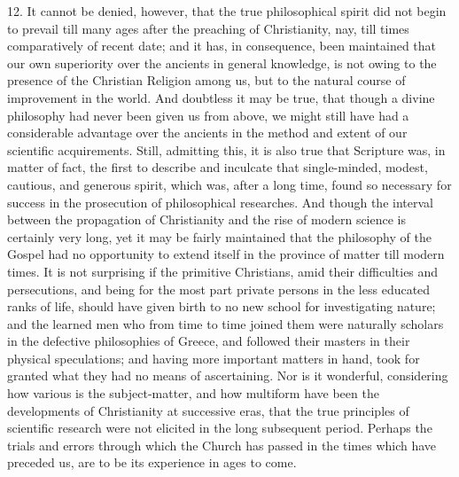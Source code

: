 12. It cannot be denied, however, that the true philosophical
spirit did not begin to prevail till many ages after the preaching of
Christianity, nay, till times comparatively of recent date; and it
has, in consequence, been maintained that our own superiority over the
ancients in general knowledge, is not owing to the presence of the
Christian Religion among us, but to the natural course of improvement
in the world. And doubtless it may be true, that though a divine
philosophy had never been given us from above, we might still have had
a considerable advantage over the ancients in the method and extent of
our scientific acquirements. Still, admitting this, it is also true
that Scripture was, in matter of fact, the first to describe and
inculcate that single-minded, modest, cautious, and generous spirit,
which was, after a long time, found so necessary for success in the
prosecution of philosophical researches. And though the interval
between the propagation of Christianity and the rise of modern science
is certainly very long, yet it may be fairly maintained that the
philosophy of the Gospel had no opportunity to extend itself in the
province of matter till modern times. It is not surprising if the
primitive Christians, amid their difficulties and persecutions, and
being for the most part private persons in the less educated ranks of
life, should have given birth to no new school for investigating
nature; and the learned men who from time to time joined them were
naturally scholars in the defective philosophies of Greece, and
followed their masters in their physical speculations; and having more
important matters in hand, took for granted what they had no means of
ascertaining. Nor is it wonderful, considering how various is the
subject-matter, and how multiform have been the developments of
Christianity at successive eras, that the true principles of
scientific research were not elicited in the long subsequent period.
Perhaps the trials and errors through which the Church has passed in
the times which have preceded us, are to be its experience in ages to
come.

